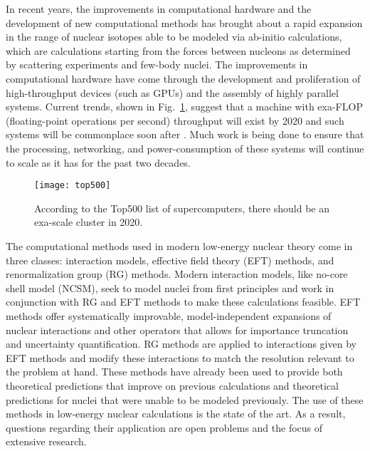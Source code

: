In recent years, the improvements in computational hardware and the development of new computational methods has brought about a rapid expansion in the range of nuclear isotopes able to be modeled via ab-initio calculations, which are calculations starting from the forces between nucleons as determined by scattering experiments and few-body nuclei. The improvements in computational hardware have come through the development and proliferation of high-throughput devices (such as GPUs) and the assembly of highly parallel systems. Current trends, shown in Fig.~\ref{fig:top500}, suggest that a machine with exa-FLOP (floating-point operations per second) throughput will exist by 2020 and such systems will be commonplace soon after \cite{Top500}. Much work is being done to ensure that the processing, networking, and power-consumption of these systems will continue to scale as it has for the past two decades.

\begin{figure}[t]
    \begin{center}
        \texttt{[image: top500]}
    \end{center}
    \caption{According to the Top500 list of supercomputers, there should be an exa-scale cluster in 2020.}
    \label{fig:top500}
\end{figure}

The computational methods used in modern low-energy nuclear theory come in three classes: interaction models, effective field theory (EFT) methods, and renormalization group (RG) methods. Modern interaction models, like no-core shell model (NCSM), seek to model nuclei from first principles and work in conjunction with RG and EFT methods to make these calculations feasible. EFT methods offer systematically improvable, model-independent expansions of nuclear interactions and other operators that allows for importance truncation and uncertainty quantification. RG methods are applied to interactions given by EFT methods and modify these interactions to match the resolution relevant to the problem at hand. These methods have already been used to provide both theoretical predictions that improve on previous calculations and theoretical predictions for nuclei that were unable to be modeled previously. The use of these methods in low-energy nuclear calculations is the state of the art. As a result, questions regarding their application are open problems and the focus of extensive research. %

